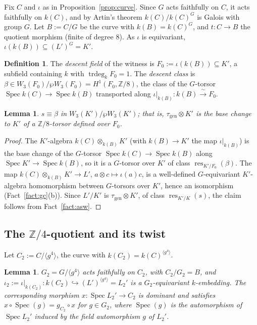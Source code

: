 \documentclass[11pt]{amsart}
\newtheorem{lemma}[theorem]{Lemma}
\theoremstyle{definition}
\newtheorem{definition}[theorem]{Definition}
\theoremstyle{remark}
\newcommand{\tr}{\operatorname{trdeg}}
\newcommand{\gen}{\mathrm{gen}}
\newcommand{\Z}{\mathbb Z}
\newcommand{\res}{\operatorname{res}}
\newcommand{\Spec}{\operatorname{Spec}}
\begin{document}
Fix $C$ and $\iota$ as in Proposition~\ref{prop:curve}. Since $G$ acts faithfully on
$C$, it acts faithfully on $k(C)$, and by Artin's theorem $k(C)/k(C)^G$ is Galois with
group $G$. Let $B:=C/G$ be the curve with $k(B)=k(C)^G$, and $t\colon C\to B$ the
quotient morphism (finite of degree $8$). As $\iota$ is equivariant,
$\iota(k(B))\subseteq(L')^G=K'$.

\begin{definition}\label{def:F0}
The \emph{descent field} of the witness is $F_0:=\iota(k(B))\subseteq K'$, a subfield
containing $k$ with $\tr_kF_0=1$. The \emph{descent class} is
$\beta\in W_3(F_0)/\wp W_3(F_0)=H^1(F_0,\Z/8)$, the class of the $G$-torsor
$\Spec k(C)\to\Spec k(B)$ transported along $\iota|_{k(B)}\colon k(B)\xrightarrow{\ \sim\ }F_0$.
\end{definition}

\begin{lemma}\label{lem:descentclass}
$s\equiv\beta$ in $W_3(K')/\wp W_3(K')$; that is, $\tau_{\gen}\otimes K'$ is the base
change to $K'$ of a $\Z/8$-torsor defined over $F_0$.
\end{lemma}

\begin{proof}
The $K'$-algebra $k(C)\otimes_{k(B)}K'$ (with $k(B)\to K'$ the map $\iota|_{k(B)}$) is
the base change of the $G$-torsor $\Spec k(C)\to\Spec k(B)$ along $\Spec K'\to\Spec k(B)$,
so it is a $G$-torsor over $K'$ of class $\res_{K'/F_0}(\beta)$. The map
$k(C)\otimes_{k(B)}K'\to L'$, $a\otimes c\mapsto\iota(a)c$, is a well-defined
$G$-equivariant $K'$-algebra homomorphism between $G$-torsors over $K'$, hence an
isomorphism (Fact~\ref{fact:gc}(b)). Since $L'/K'$ is $\tau_{\gen}\otimes K'$, of class
$\res_{K'/K}(s)$, the claim follows from Fact~\ref{fact:asw}.
\end{proof}

\subsection{The \texorpdfstring{$\Z/4$}{Z/4}-quotient and its twist}

Let $C_2:=C/\langle g^4\rangle$, the curve with $k(C_2)=k(C)^{\langle g^4\rangle}$.

\begin{lemma}\label{lem:C2}
$G_2=G/\langle g^4\rangle$ acts faithfully on $C_2$, with $C_2/G_2=B$, and
$\iota_2:=\iota|_{k(C_2)}\colon k(C_2)\hookrightarrow(L')^{\langle g^4\rangle}=L_2'$ is a
$G_2$-equivariant $k$-embedding. The corresponding morphism $x\colon\Spec L_2'\to C_2$
is dominant and satisfies $x\circ\Spec(g)=g_{C_2}\circ x$ for $g\in G_2$, where $\Spec(g)$
is the automorphism of $\Spec L_2'$ induced by the field automorphism $g$ of $L_2'$.
\end{lemma}
\end{document}
